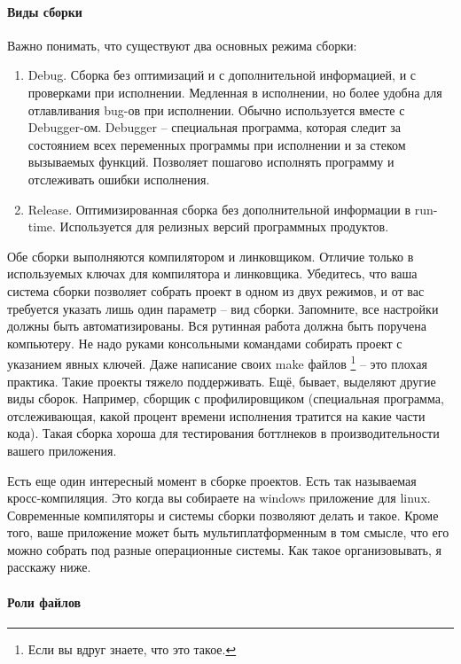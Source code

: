 \paragraph{Виды сборки}

Важно понимать, что существуют два основных режима сборки:
\begin{enumerate}
\item Debug.
Сборка без оптимизаций и с дополнительной информацией, и с проверками при исполнении.
Медленная в исполнении, но более удобна для отлавливания bug-ов при исполнении.
Обычно используется вместе с Debugger-ом.
Debugger -- специальная программа, которая следит за состоянием всех переменных программы при исполнении и за стеком вызываемых функций.
Позволяет пошагово исполнять программу и отслеживать ошибки исполнения.

\item Release.
Оптимизированная сборка без дополнительной информации в run-time.
Используется для релизных версий программных продуктов.
\end{enumerate}
Обе сборки выполняются компилятором и линковщиком.
Отличие только в используемых ключах для компилятора и линковщика.
Убедитесь, что ваша система сборки позволяет собрать проект в одном из двух режимов, и от вас требуется указать лишь один параметр -- вид сборки.
Запомните, все настройки должны быть автоматизированы.
Вся рутинная работа должна быть поручена компьютеру.
Не надо руками консольными командами собирать проект с указанием явных ключей.
Даже написание своих make файлов%
\footnote{Если вы вдруг знаете, что это такое.}
-- это плохая практика.
Такие проекты тяжело поддерживать.
Ещё, бывает, выделяют другие виды сборок.
Например, сборщик с профилировщиком (специальная программа, отслеживающая, какой процент времени исполнения тратится на какие части кода).
Такая сборка хороша для тестирования боттлнеков в производительности вашего приложения.

Есть еще один интересный момент в сборке проектов.
Есть так называемая кросс-компиляция.
Это когда вы собираете на windows приложение для linux.
Современные компиляторы и системы сборки позволяют делать и такое.
Кроме того, ваше приложение может быть мультиплатформенным в том смысле, что его можно собрать под разные операционные системы.
Как такое организовывать, я расскажу ниже.

\paragraph{Роли файлов}

